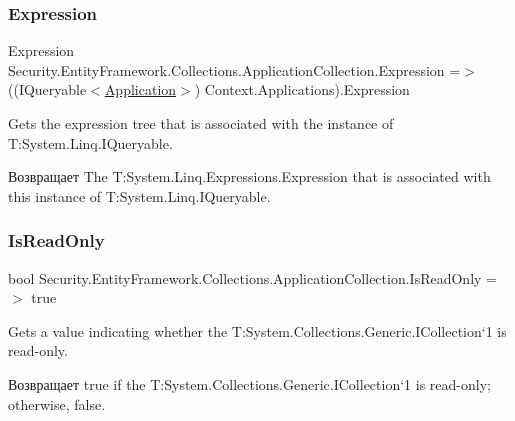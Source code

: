 \subsubsection{\texorpdfstring{Expression}{Expression}}
{\footnotesize\ttfamily Expression Security.\+Entity\+Framework.\+Collections.\+Application\+Collection.\+Expression =$>$ ((I\+Queryable$<$\hyperlink{class_security_1_1_model_1_1_application}{Application}$>$) Context.\+Applications).Expression}



Gets the expression tree that is associated with the instance of T\+:\+System.\+Linq.\+I\+Queryable. 

\begin{DoxyReturn}{Возвращает}
The T\+:\+System.\+Linq.\+Expressions.\+Expression that is associated with this instance of T\+:\+System.\+Linq.\+I\+Queryable. 
\end{DoxyReturn}
\mbox{\label{class_security_1_1_entity_framework_1_1_collections_1_1_application_collection_a55af6df83f3056a9c840fe9add79c9c4}} 
\subsubsection{\texorpdfstring{Is\+Read\+Only}{IsReadOnly}}
{\footnotesize\ttfamily bool Security.\+Entity\+Framework.\+Collections.\+Application\+Collection.\+Is\+Read\+Only =$>$ true}



Gets a value indicating whether the T\+:\+System.\+Collections.\+Generic.\+I\+Collection`1 is read-\/only. 

\begin{DoxyReturn}{Возвращает}
true if the T\+:\+System.\+Collections.\+Generic.\+I\+Collection`1 is read-\/only; otherwise, false. 
\end{DoxyReturn}
\mbox{\label{class_security_1_1_entity_framework_1_1_collections_1_1_application_collection_a9f3a6a90748e7eefa51160c5c108825e}} 
